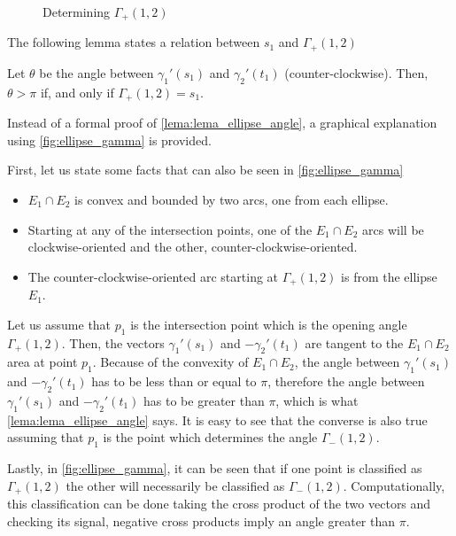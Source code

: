 \begin{figure}[H]
\centering

    \caption{Determining $\Gamma_+(1,2)$}
    
    \fautor
    \label{fig:ellipse_gamma}
\end{figure}

The following lemma states a relation between $s_1$ and $\Gamma_+(1,2)$

\begin{lema}\label{lema:lema_ellipse_angle}
	Let $\theta$ be the angle between $\gamma_1'(s_1)$ and $\gamma_2'(t_1)$ (counter-clockwise). Then, $\theta > \pi$ if, and only if $\Gamma_+(1,2)=s_1$.
\end{lema}

Instead of a formal proof of \autoref{lema:lema_ellipse_angle}, a graphical explanation using \autoref{fig:ellipse_gamma} is provided.


First, let us state some facts that can also be seen in \autoref{fig:ellipse_gamma}

\begin{itemize}
    \item $E_1 \cap E_2$ is convex and bounded by two arcs, one from each ellipse.
    \item Starting at any of the intersection points, one of the $E_1 \cap E_2$ arcs will be clockwise-oriented and the other, counter-clockwise-oriented.
    \item The counter-clockwise-oriented arc starting at $\Gamma_+(1,2)$ is from the ellipse $E_1$.
\end{itemize}


Let us assume that $p_1$ is the intersection point which is the opening angle $\Gamma_+(1,2)$. Then, the vectors $\gamma_1'(s_1)$ and $-\gamma_2'(t_1)$ are tangent to the $E_1 \cap E_2$ area at point $p_1$. Because of the convexity of $E_1 \cap E_2$, the angle between $\gamma_1'(s_1)$ and $-\gamma_2'(t_1)$ has to be less than or equal to $\pi$, therefore the angle between $\gamma_1'(s_1)$ and $-\gamma_2'(t_1)$ has to be greater than $\pi$, which is what \autoref{lema:lema_ellipse_angle} says. It is easy to see that the converse is also true assuming that $p_1$ is the point which determines the angle $\Gamma_-(1,2)$. 

Lastly, in \autoref{fig:ellipse_gamma}, it can be seen that if one point is classified as $\Gamma_+(1,2)$ the other will necessarily be classified as $\Gamma_-(1,2)$.
Computationally, this classification can be done taking the cross product of the two vectors and checking its signal, negative cross products imply an angle greater than $\pi$.

